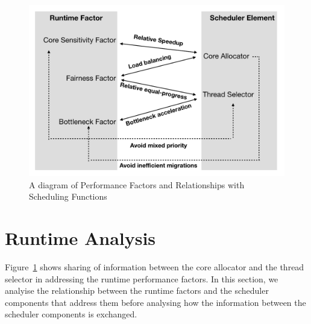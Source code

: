 \begin{figure}
\centering
\includegraphics[scale=0.4]{figures/mfa.pdf}
\caption{A diagram of Performance Factors and Relationships with Scheduling Functions}
\label{figure:f11}
\end{figure} 

\section{Runtime Analysis}
Figure~\ref{figure:f11} shows sharing of information between the core allocator and the thread selector in addressing the runtime performance factors. In this section, we analyise the relationship between the runtime factors and the scheduler components that address them before analysing how the information between the scheduler components is exchanged.
